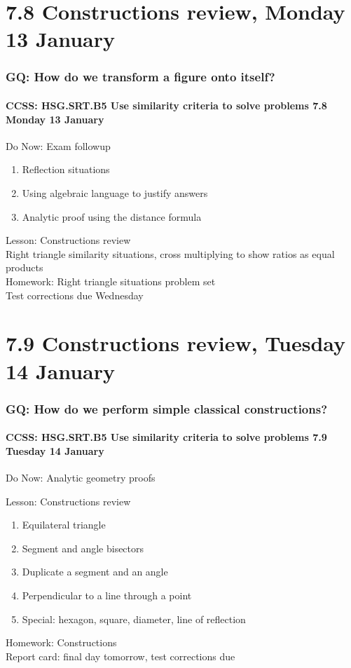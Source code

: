 \documentclass{beamer}
\begin{document}
\section{7.8 Constructions review, Monday 13 January}
\frame
{
  \frametitle{GQ: How do we transform a figure onto itself?}
  \framesubtitle{CCSS: HSG.SRT.B5 Use similarity criteria to solve problems \hfill \alert{7.8 Monday 13 January}}

  \begin{block}{Do Now: Exam followup}
  \begin{enumerate}
    \item Reflection situations
    \item Using algebraic language to justify answers
    \item Analytic proof using the distance formula
  \end{enumerate}
  \end{block}
  Lesson: Constructions review \\[0.25cm]
  Right triangle similarity situations, cross multiplying to show ratios as equal products \\[0.5cm]
  Homework: Right triangle situations problem set \\ \alert{Test corrections due Wednesday}
}

\section{7.9 Constructions review, Tuesday 14 January}
\frame
{
  \frametitle{GQ: How do we perform simple classical constructions?}
  \framesubtitle{CCSS: HSG.SRT.B5 Use similarity criteria to solve problems \hfill \alert{7.9 Tuesday 14 January}}
  Do Now: Analytic geometry proofs
  \begin{block}{Lesson: Constructions review}
  \begin{enumerate}
    \item Equilateral triangle
    \item Segment and angle bisectors
    \item Duplicate a segment and an angle
    \item Perpendicular to a line through a point
    \item Special: hexagon, square, diameter, line of reflection
  \end{enumerate}
  \end{block}
  Homework: Constructions \\[0.25cm]
  \alert{Report card: final day tomorrow, test corrections due}
}
\end{document}
